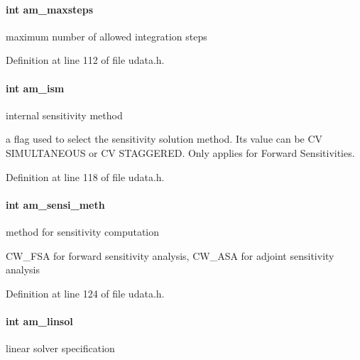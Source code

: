 \paragraph[{am\+\_\+maxsteps}]{\setlength{\rightskip}{0pt plus 5cm}int am\+\_\+maxsteps}\label{struct_user_data_a0187950731c16f2857d0cd5b92416352}
maximum number of allowed integration steps 

Definition at line 112 of file udata.\+h.

\hypertarget{struct_user_data_a1f2514c0ee00da61ade386173b718a02}{}
\paragraph[{am\+\_\+ism}]{\setlength{\rightskip}{0pt plus 5cm}int am\+\_\+ism}\label{struct_user_data_a1f2514c0ee00da61ade386173b718a02}
internal sensitivity method

a flag used to select the sensitivity solution method. Its value can be C\+V S\+I\+M\+U\+L\+T\+A\+N\+E\+O\+U\+S or C\+V S\+T\+A\+G\+G\+E\+R\+E\+D. Only applies for Forward Sensitivities. 

Definition at line 118 of file udata.\+h.

\hypertarget{struct_user_data_a83bc6716ecf3decb3d963929361fcd6d}{}
\paragraph[{am\+\_\+sensi\+\_\+meth}]{\setlength{\rightskip}{0pt plus 5cm}int am\+\_\+sensi\+\_\+meth}\label{struct_user_data_a83bc6716ecf3decb3d963929361fcd6d}
method for sensitivity computation

C\+W\+\_\+\+F\+S\+A for forward sensitivity analysis, C\+W\+\_\+\+A\+S\+A for adjoint sensitivity analysis 

Definition at line 124 of file udata.\+h.

\hypertarget{struct_user_data_a03fa52449ab4bb9a1a75312fd9064db1}{}
\paragraph[{am\+\_\+linsol}]{\setlength{\rightskip}{0pt plus 5cm}int am\+\_\+linsol}\label{struct_user_data_a03fa52449ab4bb9a1a75312fd9064db1}
linear solver specification 

